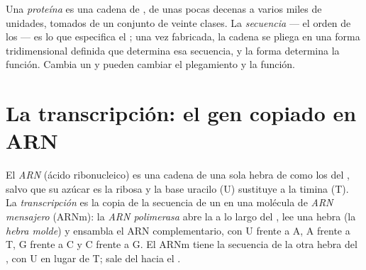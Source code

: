 \begin{definition}\label{def:g11:gene-expression:protein}
Una \emph{proteína} es una cadena de , de
unas pocas decenas a varios miles de unidades, tomados de un conjunto
de veinte clases. La \emph{secuencia} --- el orden de los 
--- es lo que especifica el ; una vez fabricada, la cadena se pliega
en una forma tridimensional definida que determina esa secuencia, y la
forma determina la función. Cambia un  y pueden cambiar el
plegamiento y la función.
\end{definition}

\section{La transcripción: el gen copiado en ARN}

\begin{definition}\label{def:g11:gene-expression:transcription}
El \emph{ARN} (ácido ribonucleico) es una cadena de una sola
hebra de  como los del , salvo que su azúcar es la ribosa
y la base uracilo (U) sustituye a la timina (T). La
\emph{transcripción} es la copia de la secuencia
de un  en una molécula de \emph{ARN mensajero}
(ARNm): la  \emph{ARN polimerasa} abre la  a lo largo
del , lee una hebra (la \emph{hebra molde}) y ensambla el ARN
complementario, con U frente a A, A frente a T, G frente a C y C frente
a G. El ARNm tiene la secuencia de la otra hebra del , con U en
lugar de T; sale del  hacia el .
\end{definition}

